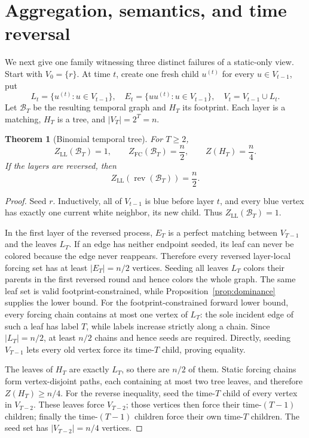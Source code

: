 \documentclass[11pt]{article}
\newtheorem{theorem}{Theorem}[section]
\theoremstyle{definition}
\theoremstyle{remark}
\newcommand{\calB}{\mathcal{B}}
\newcommand{\LL}{\mathrm{LL}}
\newcommand{\FC}{\mathrm{FC}}
\newcommand{\rev}{\operatorname{rev}}
\begin{document}
\section{Aggregation, semantics, and time reversal}\label{sec:tree}

We next give one family witnessing three distinct failures of a static-only
view.  Start with $V_0=\{r\}$.  At time $t$, create one fresh child
$u^{(t)}$ for every $u\in V_{t-1}$, put
\[
 L_t=\{u^{(t)}:u\in V_{t-1}\},\quad
 E_t=\{uu^{(t)}:u\in V_{t-1}\},\quad
 V_t=V_{t-1}\cup L_t.
\]
Let $\calB_T$ be the resulting temporal graph and $H_T$ its footprint.  Each
layer is a matching, $H_T$ is a tree, and $|V_T|=2^T=n$.

\begin{theorem}[Binomial temporal tree]\label{thm:binomial}
For $T\ge2$,
\[
 Z_{\LL}(\calB_T)=1,
 \qquad
 Z_{\FC}(\calB_T)=\frac n2,
 \qquad
 Z(H_T)=\frac n4.
\]
If the layers are reversed, then
\[
 Z_{\LL}(\rev(\calB_T))=\frac n2.
\]
\end{theorem}

\begin{proof}
Seed $r$.  Inductively, all of $V_{t-1}$ is blue before layer $t$, and every
blue vertex has exactly one current white neighbor, its new child.  Thus
$Z_{\LL}(\calB_T)=1$.

In the first layer of the reversed process, $E_T$ is a perfect matching
between $V_{T-1}$ and the leaves $L_T$.  If an edge has neither endpoint
seeded, its leaf can never be colored because the edge never reappears.
Therefore every reversed layer-local forcing set has at least
$|E_T|=n/2$ vertices.  Seeding all leaves $L_T$ colors their parents in the
first reversed round and hence colors the whole graph.  The same leaf set is
valid footprint-constrained, while Proposition~\ref{prop:dominance} supplies
the lower bound.  For the footprint-constrained forward lower bound, every
forcing chain contains at most one vertex of $L_T$: the sole incident edge of
such a leaf has label $T$, while labels increase strictly along a chain.
Since $|L_T|=n/2$, at least $n/2$ chains and hence seeds are required.
Directly, seeding $V_{T-1}$ lets every old vertex force its time-$T$ child,
proving equality.

The leaves of $H_T$ are exactly $L_T$, so there are $n/2$ of them.  Static
forcing chains form vertex-disjoint paths, each containing at most two tree
leaves, and therefore $Z(H_T)\ge n/4$.  For the reverse inequality, seed the
time-$T$ child of every vertex in $V_{T-2}$.  These leaves force
$V_{T-2}$; those vertices then force their time-$(T-1)$ children; finally the
time-$(T-1)$ children force their own time-$T$ children.  The seed set has
$|V_{T-2}|=n/4$ vertices.
\end{proof}
\end{document}
